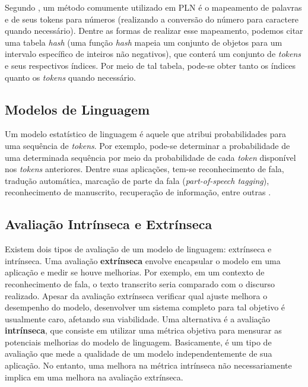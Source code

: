 \documentclass{automatextcc}
\begin{document}
Segundo \citet{manning1999}, um método comumente utilizado em PLN é o mapeamento de palavras e de seus tokens para números (realizando a conversão do número para caractere quando necessário). Dentre as formas de realizar esse mapeamento, podemos citar uma tabela \textit{hash} (uma função \textit{hash} mapeia um conjunto de objetos para um intervalo específico de inteiros não negativos), que conterá um conjunto de \textit{tokens} e seus respectivos índices. Por meio de tal tabela, pode-se obter tanto os índices quanto os \textit{tokens} quando necessário.



\subsection{Modelos de Linguagem}
Um modelo estatístico de linguagem é aquele que atribui probabilidades para uma sequência de \textit{tokens}. Por exemplo, pode-se determinar a probabilidade de uma determinada sequência por meio da probabilidade de cada \textit{token} disponível nos \textit{tokens} anteriores. Dentre suas aplicações, tem-se reconhecimento de fala, tradução automática, marcação de parte da fala (\textit{part-of-speech tagging}), reconhecimento de manuscrito, recuperação de informação, entre outras
\citep{kamath2019, jurafsky2021}.




\subsection{Avaliação Intrínseca e Extrínseca}
Existem dois tipos de avaliação de um modelo de linguagem: extrínseca e intrínseca. Uma avaliação \textbf{extrínseca} envolve encapsular o modelo em uma aplicação e medir se houve melhorias. Por exemplo, em um contexto de reconhecimento de fala, o texto transcrito seria comparado com o discurso realizado. Apesar da avaliação extrínseca verificar qual ajuste melhora o desempenho do modelo, desenvolver um sistema completo para tal objetivo é usualmente caro, afetando sua viabilidade. Uma alternativa é a avaliação \textbf{intrínseca}, que consiste em utilizar uma métrica objetiva para mensurar as potenciais melhorias do modelo de linguagem. Basicamente, é um tipo de avaliação que mede a qualidade de um modelo independentemente de sua aplicação. No entanto, uma melhora na métrica intrínseca não necessariamente implica em uma melhora na avaliação extrínseca. 
\end{document}
